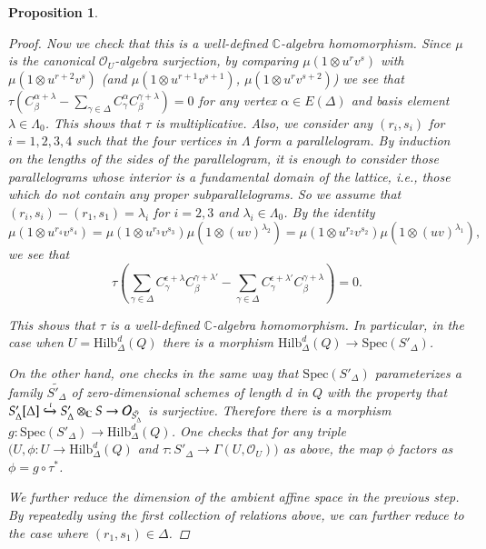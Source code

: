\documentclass{amsart}[12pt]
\newtheorem{prop}[theorem]{Proposition}
\theoremstyle{definition}
\theoremstyle{remark}
\numberwithin{equation}{section}
\newcommand{\To}{\longrightarrow}
\begin{document}
\begin{prop}
\begin{proof}
Now we check that this is a well-defined $\mathbb{C}$-algebra homomorphism. Since $\mu$ is the canonical $\mathcal{O}_U$-algebra surjection, by comparing $\mu(1 \otimes u^rv^s)$ with $\mu(1 \otimes u^{r + 2}v^s)$ (and $\mu(1 \otimes u^{r + 1}v^{s + 1})$, $\mu(1 \otimes u^{r}v^{s + 2})$) we see that $\tau (C^{\alpha + \lambda}_{\beta} - \sum_{\gamma \in \Delta}C^{\alpha}_{\gamma}C^{\gamma + \lambda}_{\beta}) = 0$ for any vertex $\alpha \in E(\Delta)$ and basis element $\lambda \in \Lambda_0$. This shows that $\tau$ is multiplicative. Also, we consider any $(r_i, s_i)$ for $i = 1, 2, 3, 4$ such that the four vertices in $\Lambda$ form a parallelogram. By induction on the lengths of the sides of the parallelogram, it is enough to consider those parallelograms whose interior is a fundamental domain of the lattice, i.e., those which do not contain any proper subparallelograms. So we assume that $(r_i, s_i) - (r_1, s_1) = \lambda_i$ for $i = 2, 3$ and $\lambda_i \in \Lambda_0$. By the identity
\[
\mu(1 \otimes u^{r_4}v^{s_4}) = \mu(1 \otimes u^{r_3}v^{s_3}) \mu(1 \otimes (uv)^{\lambda_2}) =  \mu(1 \otimes u^{r_2}v^{s_2}) \mu(1 \otimes (uv)^{\lambda_1}),
\]
we see that
 \[
 \tau\left(\sum_{\gamma \in \Delta}C^{\epsilon + \lambda}_{\gamma}C^{\gamma + \lambda'}_{\beta} - \sum_{\gamma \in \Delta}C^{\epsilon + \lambda'}_{\gamma}C^{\gamma + \lambda}_{\beta}\right) = 0.
 \]

This shows that $\tau$ is a well-defined $\mathbb{C}$-algebra homomorphism. In particular, in the case when $U = \mathrm{Hilb}^d_{\Delta}(Q)$ there is a morphism $\mathrm{Hilb}^d_{\Delta}(Q) \To \mathrm{Spec}(S'_{\Delta})$.

On the other hand, one checks in the same way that $\mathrm{Spec}(S'_{\Delta})$ parameterizes a family $\tilde{S'_{\Delta}}$ of zero-dimensional schemes of length $d$ in $Q$ with the property that $S'_{\Delta}[\Delta] \xhookrightarrow{\iota} S'_{\Delta} \otimes_{\mathbb{C}} S \rightarrow \mathcal{O}_{\tilde{S'_{\Delta}}}$ is surjective. Therefore there is a morphism $g: \mathrm{Spec}(S'_{\Delta}) \To \mathrm{Hilb}^d_{\Delta}(Q)$. One checks that for any triple $(U, \phi: U \To \mathrm{Hilb}^d_{\Delta}(Q)$ and $\tau: S'_{\Delta} \To \Gamma(U, \mathcal{O}_U))$ as above, the map $\phi$ factors as $\phi = g \circ \tau^*$.

We further reduce the dimension of the ambient affine space in the previous step. By repeatedly using the first collection of relations above, we can further reduce to the case where $(r_1, s_1) \in \Delta$.
\end{proof}
\end{prop}
\end{document}
